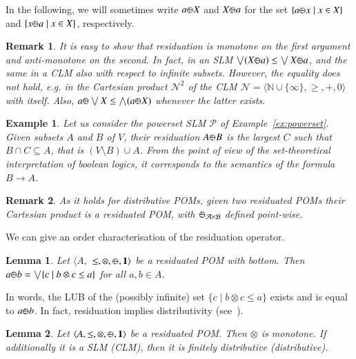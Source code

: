 \documentclass[a4paper]{elsarticle}
\newtheorem{example}{Example}
\newtheorem{remark}{Remark}
\newtheorem{lemma}{Lemma}
\newcommand{\monop}{\otimes}
\newcommand{\1}{\mathbf{1}}
\def\odiv{{ \ominus\hspace{-8pt}:}\;}
\begin{document}
In the following, we will sometimes write $a \odiv X$ and $X \odiv a$
for the set  $\{a \odiv x \mid x \in X\}$ and  $\{x \odiv a \mid x \in X\}$,
respectively.

\begin{remark}\label{natural}
	It is easy to show that residuation is monotone on the first argument and
	anti-monotone on the second. In fact, in an SLM 
	$\bigvee (X \odiv a) \leq \bigvee X \odiv a$,
	and the same in a CLM also with respect to infinite subsets.
	However, the equality does not hold,
	e.g. in the Cartesian product $\mathcal{N}^2$ of the CLM  
	$\mathcal{N} = \langle \mathbb{N} \cup \{\infty\}, \geq, +, 0 \rangle$ with itself.
	Also, 
	$a \odiv \bigvee X \leq \bigwedge (a \odiv X)$
	whenever the latter exists. %
\end{remark}

\begin{example}
Let us consider the powerset SLM $\mathcal{P}$ of Example~\ref{ex:powerset}. 
Given subsets $A$ and $B$ of $V$, their residuation $A \odiv B$ 
is the largest $C$ such that $B \cap C \subseteq A$, that is $(V \setminus B) \cup A$. From the point of view
of the set-theoretical interpretation of boolean logics, it corresponds to the semantics of the formula $B \rightarrow A$.
\end{example}

\begin{remark}
	\label{remarkC}
	As it holds for distributive POMs, given two residuated POMs their Cartesian product
	is a residuated POM, with $\odiv_{\mathcal{A} \times \mathcal{B}}$ defined point-wise.
\end{remark}

We can give an order characterisation of the residuation operator.

\begin{lemma}\label{rclm1}
	Let $\langle A,$ $\leq, \otimes,  \odiv, \1 \rangle$ be a residuated POM with bottom.
	Then $a \odiv b = \bigvee \{c \mid b \otimes c \leq a\}$ for all $a, b \in A$.
\end{lemma}

In words, the LUB of the (possibly infinite) set 
$\{c \mid b \otimes c \leq a\}$ exists and is equal to $a \odiv b$.
%
In fact, residuation implies distributivity (see~\cite[Lemma 2.2]{ipl}).

\begin{lemma}\label{rclm2}
	Let $\langle A, \leq, \monop, \odiv, \1 \rangle$ be a residuated POM. 
	Then $\monop$ is monotone.
	If additionally it is a SLM (CLM), then it is finitely distributive
	(distributive).
\end{lemma}
\end{document}
